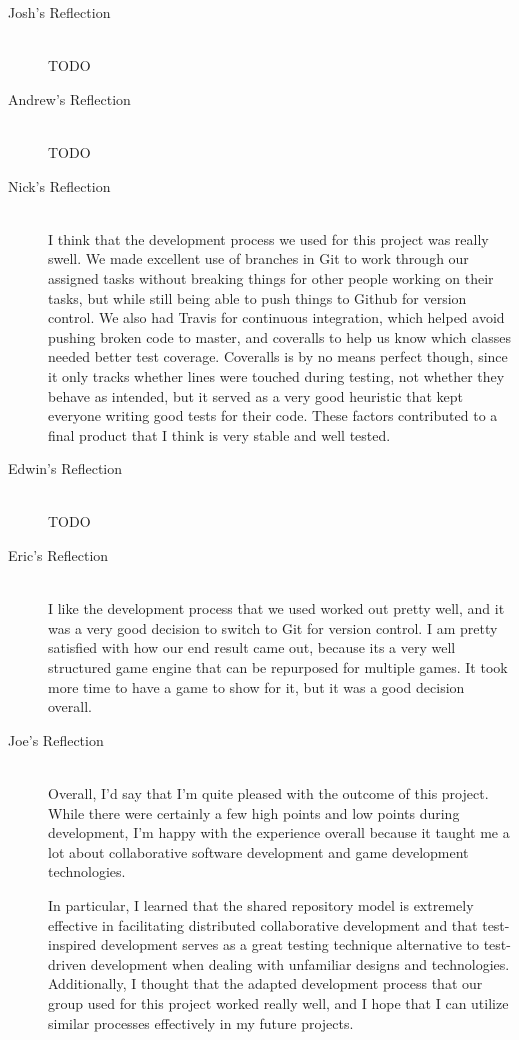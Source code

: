 \documentclass{article}
\begin{document}
		\begin{description}
			\item[Josh's Reflection] \hfill \\
			TODO

			\item[Andrew's Reflection] \hfill \\
			TODO

			\item[Nick's Reflection] \hfill \\
			I think that the development process we used for this project was
			really swell. We made excellent use of branches in Git to work through
			our assigned tasks without breaking things for other people working on
			their tasks, but while still being able to push things to Github for
			version control. We also had Travis for continuous integration, which
			helped avoid pushing broken code to master, and coveralls to help us
			know which classes needed better test coverage. Coveralls is by no means
			perfect though, since it only tracks whether lines were touched during
			testing, not whether they behave as intended, but it served as a very
			good heuristic that kept everyone writing good tests for their code.
			These factors contributed to a final product that I think is very stable
			and well tested.

			\item[Edwin's Reflection] \hfill \\
			TODO

			\item[Eric's Reflection] \hfill \\
			I like the development process that we used worked out pretty well,
			and it was a very good decision to switch to Git for version control. I
			am pretty satisfied with how our end result came out, because its 
			a very well structured game engine that can be repurposed for multiple
			games. It took more time to have a game to show for it, but it was a 
			good decision overall.

			\item[Joe's Reflection] \hfill \\
			Overall, I'd say that I'm quite pleased with the outcome of this
			project.  While there were certainly a few high points and low points
			during development, I'm happy with the experience overall because it
			taught me a lot about collaborative software development and game 
			development technologies.  
			
			In particular, I learned that the shared repository model is extremely 
			effective in facilitating distributed collaborative development and 
			that test-inspired development serves as a great testing technique 
			alternative to test-driven development when dealing with unfamiliar 
			designs and technologies.  Additionally, I thought that the adapted 
			development process that our group used for this project worked really 
			well, and I hope that I can utilize similar processes effectively 
			in my future projects.  		
	\end{description}
\end{document}
